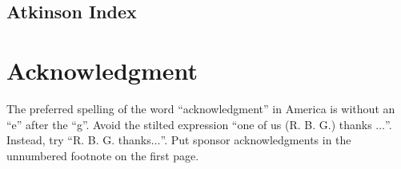 \documentclass[conference]{IEEEtran}
\begin{document}
\subsection{Atkinson Index}

\cite{sitthiyot2020simple}

\section*{Acknowledgment}

The preferred spelling of the word ``acknowledgment'' in America is without 
an ``e'' after the ``g''. Avoid the stilted expression ``one of us (R. B. 
G.) thanks $\ldots$''. Instead, try ``R. B. G. thanks$\ldots$''. Put sponsor 
acknowledgments in the unnumbered footnote on the first page.


\vspace{12pt}

\printbibliography
\end{document}
